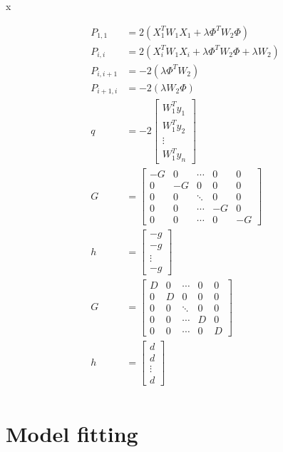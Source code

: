 \message{ !name(kalman_filter.tex)}x\documentclass{article}
\numberwithin{algorithm}{section}
\theoremstyle{plain}
\theoremstyle{definition}
\theoremstyle{remark}
\begin{document}
\begin{equation}
\begin{split}
P_{1,1} &= 2(X_1^T W_1 X_1 + \lambda \Phi^T W_2 \Phi)\\
P_{i,i} &= 2(X_i^T W_1 X_i + \lambda \Phi^T W_2 \Phi + \lambda W_2)\\
P_{i, i+1} &= -2( \lambda \Phi^T W_2)\\
P_{i+1, i} &= - 2(\lambda W_2 \Phi)\\
q &= 
-2\left[
\begin{array}{c}
W_1^T y_1\\
W_1^T y_2\\
\vdots\\
W_1^T y_n
\end{array}
\right]\\
G &= \left[
\begin{array}{ccccc}
-G&0&\cdots&0&0\\
0&-G&0&0&0\\
0&0&\ddots&0&0\\
0&0&\cdots&-G&0\\
0&0&\cdots&0&-G
\end{array}
\right]\\
h &= 
\left[
\begin{array}{c}
-g\\
-g\\
\vdots\\
-g
\end{array}
\right]\\
G &= \left[
\begin{array}{ccccc}
D&0&\cdots&0&0\\
0&D&0&0&0\\
0&0&\ddots&0&0\\
0&0&\cdots&D&0\\
0&0&\cdots&0&D
\end{array}
\right]\\
h &= 
\left[
\begin{array}{c}
d\\
d\\
\vdots\\
d
\end{array}
\right]\\
\end{split}
\end{equation}


\section{Model fitting}
\end{document}
